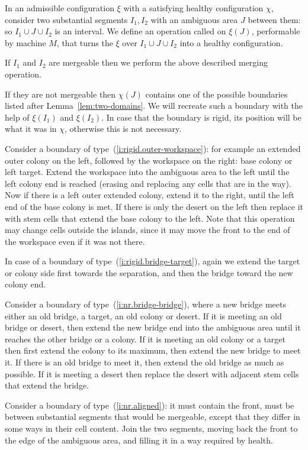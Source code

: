\documentclass[12pt]{memoir}
\begin{document}
\begin{definition}[Stitching]\label{def:stitching}
In an admissible configuration \( \xi \) with a satisfying healthy configuration \( \chi \),
consider two substantial segments \( I_{1},I_{2} \) with an ambiguous area \( J \) 
between them: so \( I_{1}\cup J\cup I_{2} \) is an interval.
We define an operation called 
on \( \xi(J) \), performable by machine \( M \), that turns the
\( \xi \) over  \( I_{1}\cup J\cup I_{2} \) into a healthy configuration.

If \( I_{1} \) and \( I_{2} \) are mergeable then we perform the above described merging operation.

If they are not mergeable then \( \chi(J) \) contains one of the possible boundaries
listed after Lemma~\ref{lem:two-domains}.
We will recreate such a boundary with the help of \( \xi(I_{1}) \) and \( \xi(I_{2}) \).
In case that the boundary is rigid, its position will be what it was in \( \chi \),
otherwise this is not necessary.

Consider a boundary of type~(\ref{i:rigid.outer-workspace}): for example
an extended outer colony on the left, followed by the workspace on the right: base colony 
or left target.
Extend the workspace into the ambiguous area to the left until the left colony end is reached
(erasing and replacing any cells that are in the way).
Now if there is a left outer extended colony, extend it to the right, until
the left end of the base colony is met.
If there is only the desert on the left then replace it with stem cells that extend the base
colony to the left.
Note that this operation may change cells outside the islands, since it may move the front to the
end of the workspace even if it was not there.

In case of a boundary of type~(\ref{i:rigid.bridge-target}),
again we extend the target or colony side first towards the separation,
and then the bridge toward the new colony end.

Consider a boundary of type~(\ref{i:nr.bridge-bridge}), where a new bridge
meets either an old bridge, a target, an old colony or desert.
If it is meeting an old bridge or desert, then
extend the new bridge end into the ambiguous area until it reaches the
other bridge or a colony.
If it is meeting an old colony or a target then first extend the colony to its maximum,
then extend the new bridge to meet it.
If there is an old bridge to meet it, then extend the old bridge as much as possible.
If it is meeting a desert then replace the desert with adjacent 
stem cells that extend the bridge.

Consider a boundary of type~(\ref{i:nr.aligned}): 
it must contain the front, must 
be between substantial segments that would be mergeable, except that they
differ in some ways in their cell content.
Join the two segments, moving back the front to the edge of the ambiguous area,
and filling it in a way required by health.

\end{definition}
\end{document}
